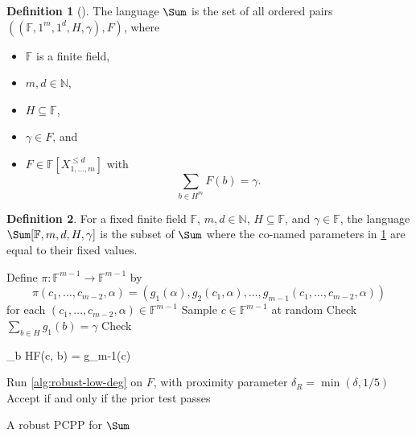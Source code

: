 \documentclass[english,12pt]{reedthesis}
\theoremstyle{plain}
\theoremstyle{definition}
\newtheorem{defn}[defn]{Definition}
\theoremstyle{remark}
\begin{document}
\begin{defn}[{\cite[Def.\ 4.1]{GOS25}}]\label{def:sum-lang}
  The language $\Sum$ is the set of all ordered pairs
  $((\mathbb{F}, 1^{m}, 1^{d}, H, \gamma), F)$, where
  \begin{itemize}
    \item $\mathbb{F}$ is a finite field,
    \item $m, d \in \mathbb{N}$,
    \item $H \subseteq \mathbb{F}$,
    \item $\gamma \in F$, and
    \item $F \in \mathbb{F}[X_{1, \ldots, m}^{\le d}]$ with
          \[
            \sum_{b \in H^{m}}F(b) = \gamma.
          \]
  \end{itemize}
\end{defn}

\begin{defn}\label{def:sum-params}
  For a fixed finite field $\mathbb{F}$, $m, d \in \mathbb{N}$, $H \subseteq \mathbb{F}$, and
  $\gamma \in \mathbb{F}$, the language $\Sum[\mathbb{F}, m, d, H, \gamma]$ is the subset of
  $\Sum$ where the co-named parameters in \cref{def:sum-lang} are equal to their
  fixed values.
\end{defn}

\begin{algorithm}[htbp]
  Define $\pi\colon \mathbb{F}^{m-1} \rightarrow \mathbb{F}^{m-1}$ by
  \[
    \pi(c_{1}, \ldots, c_{m-2}, \alpha) = (g_{1}(\alpha), g_{2}(c_{1}, \alpha), \ldots, g_{m-1}(c_{1}, \ldots, c_{m-2}, \alpha))
  \]
  for each $(c_{1}, \ldots, c_{m-2}, \alpha) \in \mathbb{F}^{m-1}$\;
  \KwRet{$\pi$}\;
  Sample $c \in \mathbb{F}^{m-1}$ at random\;
  Check $\sum_{b \in H}g_{1}(b) = \gamma$\;
  Check
  \begin{algomathdisplay}
    \sum_{b \in H}F(c, b) = g_{m-1}(c)
  \end{algomathdisplay}
  Run \cref{alg:robust-low-deg} on $F$, with proximity parameter
  $\delta_{R} = \min(\delta, 1/5)$\;
  Accept if and only if the prior test passes\;
  \caption{A robust PCPP for $\Sum$~\cite[Construction 4.3]{GOS25}}\label{alg:sum-pcpp}
\end{algorithm}
\end{document}
